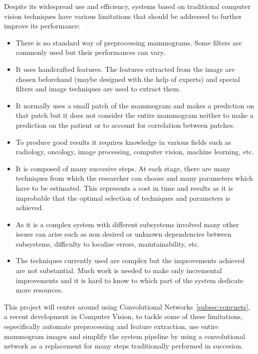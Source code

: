 Despite its widespread use and efficiency, systems based on traditional computer vision techniques have various limitations that should be addressed to further improve its performance:
\begin{itemize}
	\item There is no standard way of preprocessing mammograms. Some filters are commonly used but their performances can vary.
	\item It uses handcrafted features. The features extracted from the image are chosen beforehand (maybe designed with the help of experts) and special filters and image techniques are used to extract them.
	\item It normally uses a small patch of the mammogram and makes a prediction on that patch but it does not consider the entire mammogram neither to make a prediction on the patient or to account for correlation between patches.
	\item To produce good results it requires knowledge in various fields such as radiology, oncology, image processing, computer vision, machine learning, etc.
	\item It is composed of many succesive steps. At each stage, there are many techniques from which the researcher can choose and many parameters which have to be estimated. This represents a cost in time and results as it is improbable that the optimal selection of techniques and parameters is achieved.
	\item As it is a complex system with different subsystems involved many other issues can arise such as non desired or unknown dependencies between subsystems, difficulty to localize errors, maintainability, etc.  
	\item The techniques currently used are complex but the improvements achieved are not substantial. Much work is needed to make only incremental improvements and it is hard to know to which part of the system dedicate more resources.
\end{itemize}

This project will center around using Convolutional Networks~\ref{subsec:convnets}, a recent development in Computer Vision, to tackle some of these limitations, especifically automate preprocessing and feature extraction, use entire mammogram images and simplify the system pipeline by using a convolutional network as a replacement for many steps traditionally performed in succesion.

